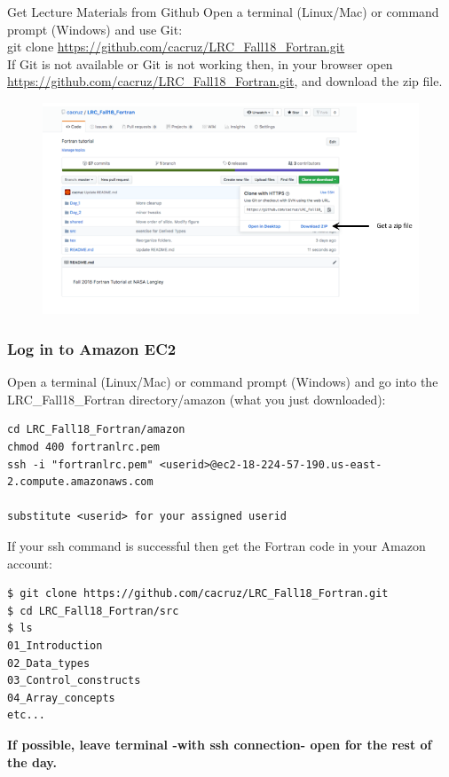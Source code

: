 \documentclass[11pt]{beamer}
\begin{document}
\begin{frame}{Get Lecture Materials from Github}
\footnotesize{Open a terminal (Linux/Mac) or command prompt (Windows) and use Git:\\}
\footnotesize{\quad git clone \url{https://github.com/cacruz/LRC_Fall18_Fortran.git}}\\
\vspace{5mm}
If Git is not available or Git is not working then, in your browser open \url{https://github.com/cacruz/LRC_Fall18_Fortran.git}, and download the zip file.
\begin{figure}[t]
\centering
\includegraphics[scale=.25]{../../shared/github_zip}
\end{figure}

\end{frame}


\begin{frame}[fragile]
\frametitle{Log in to Amazon EC2}

\footnotesize{Open a terminal (Linux/Mac) or command prompt (Windows) and go into the LRC\_Fall18\_Fortran directory/amazon (what you just downloaded):}

\tiny{
\begin{Verbatim} 
cd LRC_Fall18_Fortran/amazon
chmod 400 fortranlrc.pem
ssh -i "fortranlrc.pem" <userid>@ec2-18-224-57-190.us-east-2.compute.amazonaws.com

substitute <userid> for your assigned userid
\end{Verbatim}
}
\footnotesize{If your ssh command is successful then get the Fortran code in your Amazon account:}
\scriptsize{
\begin{Verbatim} 
$ git clone https://github.com/cacruz/LRC_Fall18_Fortran.git
$ cd LRC_Fall18_Fortran/src
$ ls
01_Introduction
02_Data_types
03_Control_constructs
04_Array_concepts
etc...
\end{Verbatim}
}
\begin{center}
\textbf{If possible, leave terminal -with ssh connection- open for the rest of the day.}
\end{center}
\end{frame}
\end{document}
